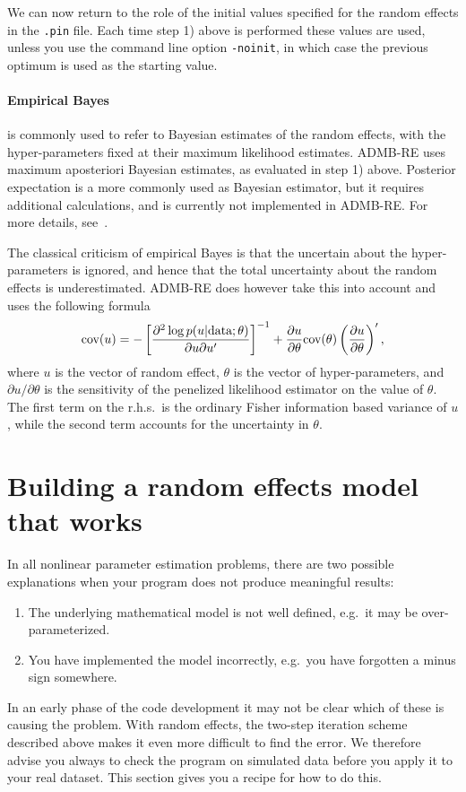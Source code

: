 \documentclass[12pt,letter,reqno]{book}
\begin{document}
We can now return to the role of the initial values specified for the random effects in the \texttt{.pin} file.
Each time step 1) above is performed these values are used, unless you use the command line option \texttt{-noinit},
in which case the previous optimum is used as the starting value.

\paragraph{Empirical Bayes} is commonly used to refer to Bayesian estimates of the random effects, with
the hyper-parameters fixed at their maximum likelihood estimates. ADMB-RE uses
maximum aposteriori Bayesian estimates, as evaluated in step 1) above. 
Posterior expectation is a more commonly used as Bayesian estimator, but it requires additional calculations, and
is currently not implemented in ADMB-RE. For more details, see~.

The classical criticism of empirical Bayes is that the uncertain about the hyper-parameters is ignored,
and hence that the total uncertainty about the random effects is underestimated. ADMB-RE does however
take this into account and uses the following formula
\begin{equation}
\hbox{cov}(u)
  =
    -\left[\frac{\partial^{2}\log p(u|\hbox{data};\theta)}
  {\partial u\partial u^{\prime}}\right]^{-1}+ \frac{
  \partial u}{\partial\theta}
  \hbox{cov}(\theta) \left(\frac{\partial u}{\partial\theta}\right)^{\prime},
  \label{eq:EB_variance}
\end{equation}
where $u$ is the vector of random effect, $\theta$ is the vector of hyper-parameters, 
and $\partial u/\partial\theta$ is the sensitivity of the penelized likelihood estimator on the
value of $\theta$. The first term on the r.h.s.~is the ordinary Fisher information based variance
of $u$, while the second term accounts for the uncertainty in $\theta$.

\section{Building a random effects model that works}

In all nonlinear parameter estimation problems, there are two possible
explanations when your program does not produce meaningful results:

\begin{enumerate}
\item The underlying mathematical model is not well defined, e.g.~it may be
over-parameterized.
\item You have implemented the model incorrectly, e.g.~you have forgotten a
minus sign somewhere.
\end{enumerate}
In an early phase of the code development it may not be clear which of these
is causing the problem. With random effects, the two-step iteration scheme
described above makes it even more difficult to find the error. We therefore
advise you always to check the program on simulated data before you apply it to your real dataset. This
section gives you a recipe for how to do this.
\end{document}
